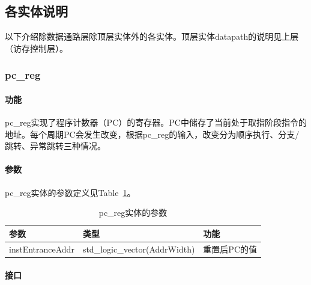 \documentclass{article}
\begin{document}
\begin{spacing}{1.4}
\subsection{各实体说明}

以下介绍除数据通路层除顶层实体外的各实体。顶层实体datapath的说明见上层（访存控制层）。

\subsubsection{pc\_reg}

\paragraph{功能}\mbox{}

pc\_reg实现了程序计数器（PC）的寄存器。PC中储存了当前处于取指阶段指令的地址。每个周期PC会发生改变，根据pc\_reg的输入，改变分为顺序执行、分支/跳转、异常跳转三种情况。

\paragraph{参数}\mbox{}

pc\_reg实体的参数定义见Table~\ref{tb:pcreg-parameter}。
\begin{table}[!htb]
\begin{center}
\begin{tabular*}{15cm}{l|l|l}  
\hline  
\textbf{参数}&\textbf{类型}&\textbf{功能} \\
\hline instEntranceAddr        & std\_logic\_vector(AddrWidth)    & 重置后PC的值 \\
\hline 
\end{tabular*}  
\caption{pc\_reg实体的参数}
\label{tb:pcreg-parameter}
\end{center}
\end{table}

\paragraph{接口}\mbox{}


\end{spacing}
\end{document}
